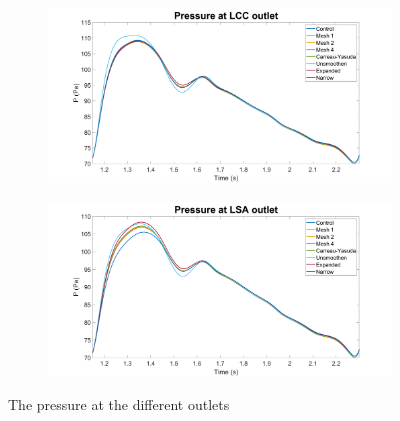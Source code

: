 \begin{figure}
\begin{subfigure}[b]{0.49\textwidth}
     \end{subfigure}
     \hfill
     \begin{subfigure}[b]{0.49\textwidth}
         \centering
         \includegraphics[width=\textwidth]{Figures/PLCC.png}
     \end{subfigure}
     \hfill
     \begin{subfigure}[b]{0.49\textwidth}
         \centering
         \includegraphics[width=\textwidth]{Figures/PLSA.png}
     \end{subfigure}
        \caption{The pressure at the different outlets}
        \label{fig:pressure}
\end{figure}

